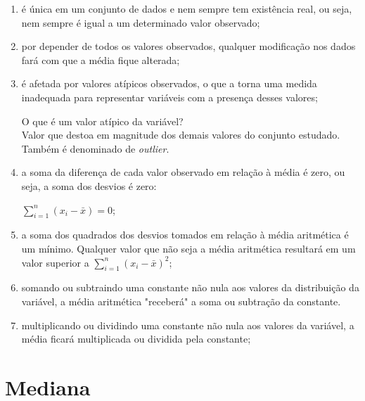 \documentclass[11pt,fleqn]{book} %
\begin{document}
\begin{enumerate}

\item é única em um conjunto de dados e nem sempre tem existência real, ou seja, nem sempre é igual a um determinado valor observado;

\item por depender de todos os valores observados, qualquer modificação nos dados fará com que a média fique alterada;

\item é afetada por valores atípicos observados, o que a torna uma medida inadequada para representar variáveis com a presença desses valores;

\begin{eBox}
O que é um valor atípico da variável?\\
Valor que destoa em magnitude dos demais valores do conjunto estudado. Também é denominado de {\itshape outlier}. 
\end{eBox}

\item a soma da diferença de cada valor observado em relação à média é zero, ou seja, a soma dos desvios é zero: 
\begin{center}
$\displaystyle \sum_{i=1}^{n}{(x_i-\bar{x})}=0$;
\end{center}
	 
\item a soma dos quadrados dos desvios tomados em relação à média aritmética é um mínimo. Qualquer valor que não seja a média aritmética resultará em um valor superior a $\displaystyle \sum_{i=1}^{n}{(x_i-\bar{x})^2}$;

\item somando ou subtraindo uma constante não nula aos valores da distribuição da variável, a média aritmética "receberá" a soma ou subtração da constante.

\item multiplicando ou dividindo uma constante não nula aos valores da variável, a média ficará multiplicada ou dividida pela constante; \\

\end{enumerate}

\vspace{2cm}



\section{Mediana}
\end{document}
